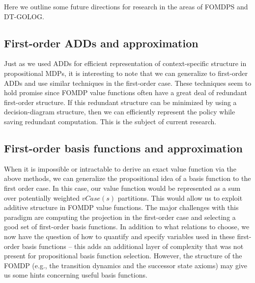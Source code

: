 Here we outline some future directions for research in the areas
of FOMDPS and DT-GOLOG.


\subsection{First-order ADDs and approximation}

Just as we used ADDs for efficient representation of context-specific
structure in propositional MDPs, it is interesting to note that we
can generalize to first-order ADDs and use similar techniques in the
first-order case.  These techniques seem to hold promise since FOMDP
value functions often have a great deal of redundant first-order structure.  If this
redundant structure can be minimized by using a decision-diagram structure,
then we can efficiently represent the policy while saving redundant computation.
This is the subject of current research.

\subsection{First-order basis functions and approximation}

When it is impossible or intractable to derive an exact value function
via the above methods, we can generalize the propositional idea of a
basis function to the first order case.  In this case, our value
function would be represented as a sum over potentially weighted
$vCase(s)$ partitions.  This would allow us to exploit additive
structure in FOMDP value functions.  The major challenges with this
paradigm are computing the projection in the first-order case and
selecting a good set of first-order basis functions.  In
addition to what relations to choose, we now have the question of how
to quantify and specify variables used in these first-order basis
functions -- this adds an additional layer of complexity that was not
present for propositional basis function selection.  However, the
structure of the FOMDP (e.g., the transition dynamics and the
successor state axioms) may give us some hints concerning useful
basis functions.


